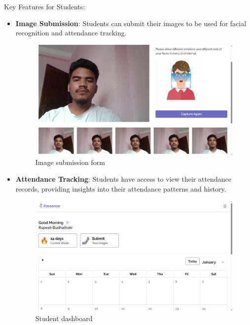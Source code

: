 Key Features for Students:
\begin{itemize} 
\item \textbf{Image Submission}: Students can submit their images to be used for facial recognition and attendance tracking.
\begin{figure}[H]
    \includegraphics[width=\linewidth]{figures/submit-images.png}
    \centering
    \caption{Image submission form}
\end{figure}
\item \textbf{Attendance Tracking}: Students have access to view their attendance records, providing insights into their attendance patterns and history.
\begin{figure}[H]
    \includegraphics[width=\linewidth]{figures/student-dash.png}
    \centering
    \caption{Student dashboard}
\end{figure}
\end{itemize}


